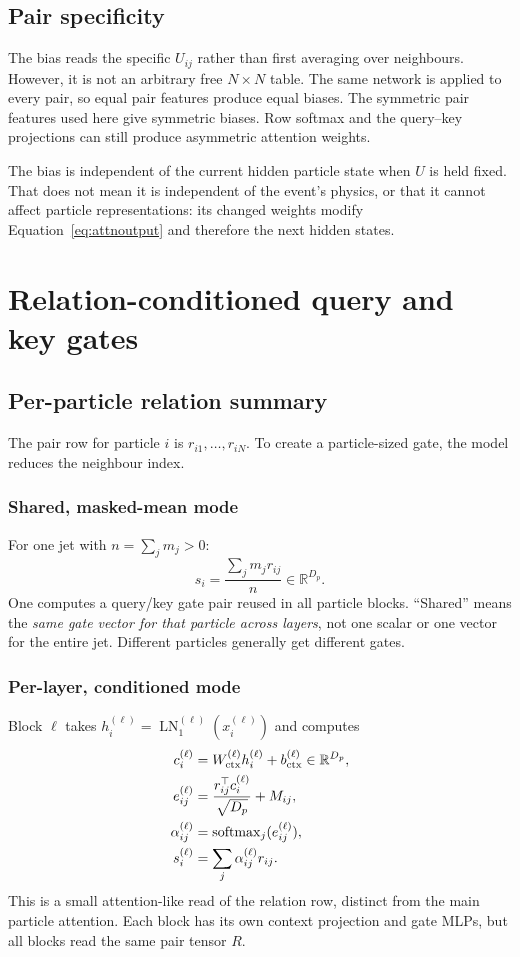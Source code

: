 \documentclass[11pt,a4paper]{article}
\newcommand{\R}{\mathbb R}
\newcommand{\softmax}{\operatorname{softmax}}
\newcommand{\LN}{\operatorname{LN}}
\newcommand{\code}[1]{\texttt{\small\detokenize{#1}}}
\numberwithin{equation}{section}
\begin{document}
\subsection{Pair specificity}
The bias reads the specific $U_{ij}$ rather than first averaging over
neighbours. However, it is not an arbitrary free $N\times N$ table.
The same network is applied to every pair, so equal pair features produce
equal biases. The symmetric pair features used here give symmetric biases.
Row softmax and the query--key projections can still produce asymmetric
attention weights.

The bias is independent of the current hidden particle state when $U$ is
held fixed. That does not mean it is independent of the event's physics,
or that it cannot affect particle representations: its changed weights
modify Equation~\eqref{eq:attnoutput} and therefore the next hidden states.

\section{Relation-conditioned query and key gates}
\subsection{Per-particle relation summary}
The pair row for particle $i$ is $r_{i1},\ldots,r_{iN}$.
To create a particle-sized gate, the model reduces the neighbour index.

\subsubsection{Shared, masked-mean mode}
For one jet with $n=\sum_jm_j>0$:
\begin{equation}\label{eq:meansummary}
 s_i=\frac{\sum_jm_jr_{ij}}{n}\in\R^{D_p}.
\end{equation}
One \code{RelationalGate} computes a query/key gate pair reused in all
particle blocks. ``Shared'' means the \emph{same gate vector for that
particle across layers}, not one scalar or one vector for the entire jet.
Different particles generally get different gates.

\subsubsection{Per-layer, conditioned mode}
Block $\ell$ takes $h_i^{(\ell)}=\LN_1^{(\ell)}(x_i^{(\ell)})$ and computes
\begin{align}
 c_i^{(\ell)}&=W_{\rm ctx}^{(\ell)}h_i^{(\ell)}+b_{\rm ctx}^{(\ell)}
                         \in\R^{D_p},\\
 e_{ij}^{(\ell)}&=\frac{r_{ij}^\top c_i^{(\ell)}}{\sqrt{D_p}}+M_{ij},\\
 \alpha_{ij}^{(\ell)}&=\softmax_j(e_{ij}^{(\ell)}),\\
 s_i^{(\ell)}&=\sum_j\alpha_{ij}^{(\ell)}r_{ij}.
\end{align}
This is a small attention-like read of the relation row, distinct from
the main particle attention. Each block has its own context projection
and gate MLPs, but all blocks read the same pair tensor $R$.
\end{document}
